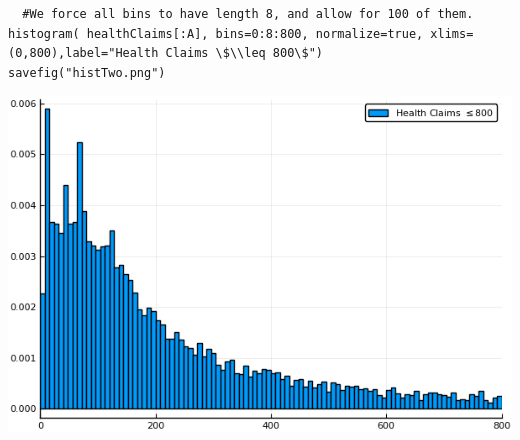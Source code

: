\documentclass[12pt, letterpaper]{paper}
\begin{document}
\begin{verbatim}
  #We force all bins to have length 8, and allow for 100 of them.
histogram( healthClaims[:A], bins=0:8:800, normalize=true, xlims=(0,800),label="Health Claims \$\\leq 800\$")
savefig("histTwo.png")
\end{verbatim}

\begin{center}
\includegraphics[width=.9\linewidth]{histTwo.png}
\end{center}
\end{document}
